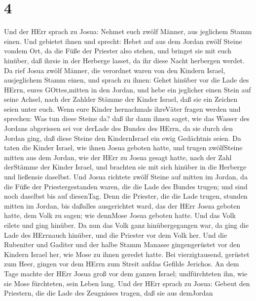 \hypertarget{section-3}{%
\section{4}\label{section-3}}

 Und der HErr sprach zu Josua:  Nehmet euch
zwölf Männer, aus jeglichem Stamm einen.  Und gebietet ihnen
und sprecht: Hebet auf aus dem Jordan zwölf Steine vondem Ort, da die
Füße der Priester also stehen, und bringet sie mit euch hinüber, daß
ihrsie in der Herberge lasset, da ihr diese Nacht herbergen werdet.
 Da rief Josua zwölf Männer, die verordnet waren von den
Kindern Israel, ausjeglichem Stamm einen,  und sprach zu
ihnen: Gehet hinüber vor die Lade des HErrn, eures GOttes,mitten in den
Jordan, und hebe ein jeglicher einen Stein auf seine Achsel, nach der
Zahlder Stämme der Kinder Israel,  daß sie ein Zeichen seien
unter euch. Wenn eure Kinder hernachmals ihreVäter fragen werden und
sprechen: Was tun diese Steine da?  daß ihr dann ihnen
saget, wie das Wasser des Jordans abgerissen sei vor derLade des Bundes
des HErrn, da sie durch den Jordan ging, daß diese Steine den
KindernIsrael ein ewig Gedächtnis seien.  Da taten die
Kinder Israel, wie ihnen Josua geboten hatte, und trugen zwölfSteine
mitten aus dem Jordan, wie der HErr zu Josua gesagt hatte, nach der Zahl
derStämme der Kinder Israel, und brachten sie mit sich hinüber in die
Herberge und ließensie daselbst.  Und Josua richtete zwölf
Steine auf mitten im Jordan, da die Füße der Priestergestanden waren,
die die Lade des Bundes trugen; und sind noch daselbst bis auf
diesenTag.  Denn die Priester, die die Lade trugen, stunden
mitten im Jordan, bis daßalles ausgerichtet ward, das der HErr Josua
geboten hatte, dem Volk zu sagen; wie dennMose Josua geboten hatte. Und
das Volk eilete und ging hinüber.  Da nun das Volk ganz
hinübergegangen war, da ging die Lade des HErrnauch hinüber, und die
Priester vor dem Volk her.  Und die Rubeniter und Gaditer
und der halbe Stamm Manasse gingengerüstet vor den Kindern Israel her,
wie Mose zu ihnen geredet hatte.  Bei vierzigtausend,
gerüstet zum Heer, gingen vor dem HErrn zum Streit aufdas Gefilde
Jerichos.  An dem Tage machte der HErr Josua groß vor dem
ganzen Israel; undfürchteten ihn, wie sie Mose fürchteten, sein Leben
lang.  Und der HErr sprach zu Josua:  Gebeut
den Priestern, die die Lade des Zeugnisses tragen, daß sie aus demJordan
